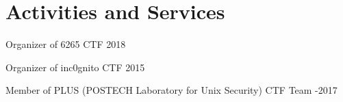 \section*{Activities and Services}
\begin{description}
  \item Organizer of 6265 CTF 2018

  \item Organizer of inc0gnito CTF 2015

  \item Member of PLUS (POSTECH Laboratory for Unix Security) CTF Team 
  -2017
\end{description}
